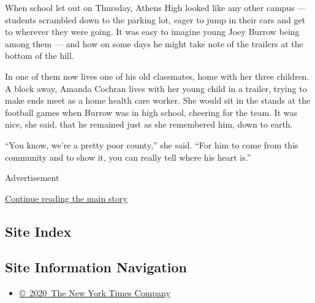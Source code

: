 When school let out on Thursday, Athens High looked like any other
campus --- students scrambled down to the parking lot, eager to jump in
their cars and get to wherever they were going. It was easy to imagine
young Joey Burrow being among them --- and how on some days he might
take note of the trailers at the bottom of the hill.

In one of them now lives one of his old classmates, home with her three
children. A block away, Amanda Cochran lives with her young child in a
trailer, trying to make ends meet as a home health care worker. She
would sit in the stands at the football games when Burrow was in high
school, cheering for the team. It was nice, she said, that he remained
just as she remembered him, down to earth.

``You know, we're a pretty poor county,'' she said. ``For him to come
from this community and to show it, you can really tell where his heart
is.''

Advertisement

\protect\hyperlink{after-bottom}{Continue reading the main story}

\hypertarget{site-index}{%
\subsection{Site Index}\label{site-index}}

\hypertarget{site-information-navigation}{%
\subsection{Site Information
Navigation}\label{site-information-navigation}}

\begin{itemize}
\tightlist
\item
  \href{https://help.nytimes3xbfgragh.onion/hc/en-us/articles/115014792127-Copyright-notice}{©~2020~The
  New York Times Company}
\end{itemize}

